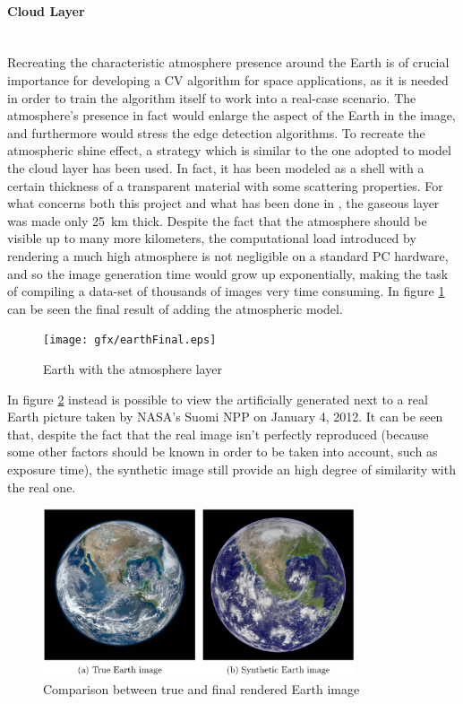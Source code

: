 \paragraph{Cloud Layer}\mbox{}\\
Recreating the characteristic atmosphere presence around the Earth is of crucial importance for developing a CV algorithm for space applications, as it is needed in order to train the algorithm itself to work into a real-case scenario.
The atmosphere's presence in fact would enlarge the aspect of the Earth in the image, and furthermore would stress the edge detection algorithms.
To recreate the atmospheric shine effect, a strategy which is similar to the one adopted to model the cloud layer has been used. In fact, it has been modeled as a shell with a certain thickness of a transparent material with some scattering properties.
For what concerns both this project and what has been done in \cite{jacopo}, the gaseous layer was made only \SI{25}{\km} thick. Despite the fact that the atmosphere should be visible up to many more kilometers, the computational load introduced by rendering a much high atmosphere is not negligible on a standard PC hardware, and so the image generation time would grow up exponentially, making the task of compiling a data-set of thousands of images very time consuming.
In figure \ref{fig:earthAtmo} can be seen the final result of adding the atmospheric model.

\begin{figure}[htbp]
  \centering
  \texttt{[image: gfx/earthFinal.eps]}
  \caption{Earth with the atmosphere layer}
  \label{fig:earthAtmo}
\end{figure}

In figure \ref{fig:trueVsFake} instead is possible to view the artificially generated next to a real Earth picture taken by NASA's Suomi NPP on January 4, 2012.
It can be seen that, despite the fact that the real image isn't perfectly reproduced (because some other factors should be known in order to be taken into account, such as exposure time), the synthetic image still provide an high degree of similarity with the real one.

\begin{figure}[htbp]
  \centering
  \includegraphics[width=0.82\textwidth]{gfx/trueVsFake.eps}
  \caption{Comparison between true and final rendered Earth image}
  \label{fig:trueVsFake}
\end{figure}

